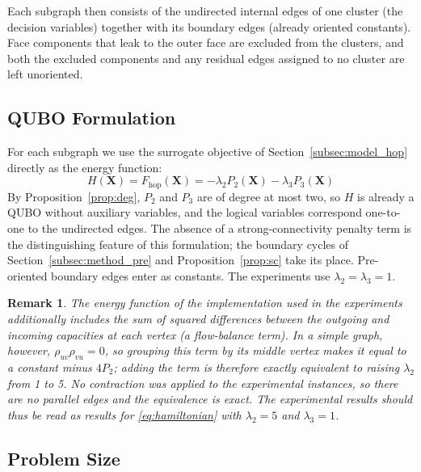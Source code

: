 \documentclass[twocolumn,a4paper]{article}
\newtheorem{remark}{Remark}
\begin{document}
Each subgraph then consists of the undirected internal edges of one cluster (the decision variables) together with its boundary edges (already oriented constants). Face components that leak to the outer face are excluded from the clusters, and both the excluded components and any residual edges assigned to no cluster are left unoriented.

\subsection{QUBO Formulation} \label{subsec:method_qubo}

For each subgraph we use the surrogate objective of Section~\ref{subsec:model_hop} directly as the energy function:
\begin{equation}
    H(\mathbf{X})=F_{\mathrm{hop}}(\mathbf{X})=-\lambda_2P_2(\mathbf{X})-\lambda_3P_3(\mathbf{X})
\label{eq:hamiltonian}
\end{equation}
By Proposition~\ref{prop:deg}, \(P_2\) and \(P_3\) are of degree at most two, so \(H\) is already a QUBO without auxiliary variables, and the logical variables correspond one-to-one to the undirected edges. The absence of a strong-connectivity penalty term is the distinguishing feature of this formulation; the boundary cycles of Section~\ref{subsec:method_pre} and Proposition~\ref{prop:sc} take its place. Pre-oriented boundary edges enter as constants. The experiments use \(\lambda_2=\lambda_3=1\).

\begin{remark} \label{rmk:flow}
The energy function of the implementation used in the experiments additionally includes the sum of squared differences between the outgoing and incoming capacities at each vertex (a flow-balance term). In a simple graph, however, \(\rho_{uv}\rho_{vu}=0\), so grouping this term by its middle vertex makes it equal to a constant minus \(4P_2\); adding the term is therefore exactly equivalent to raising \(\lambda_2\) from 1 to 5. No contraction was applied to the experimental instances, so there are no parallel edges and the equivalence is exact. The experimental results should thus be read as results for \eqref{eq:hamiltonian} with \(\lambda_2=5\) and \(\lambda_3=1\).
\end{remark}

\subsection{Problem Size} \label{subsec:method_partition}
\end{document}
